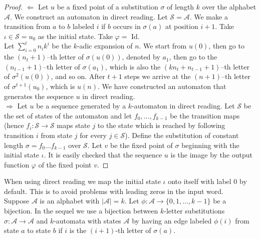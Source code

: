 \documentclass{article}
\begin{document}
\begin{proof}
$\Leftarrow$ Let $u$ be a fixed point of a substitution $\sigma$ of length
$k$ over the alphabet $\mathcal{A}$. We construct an automaton in direct 
reading. Let $\mathcal{S = A}$. We make a transition from $a$ to $b$ labeled 
$i$ if $b$ occurs in $\sigma(a)$ at position $i + 1$. Take 
$\iota \in \mathcal{S} = u_0$ as the initial state. Take $\varphi =$ Id.\\
Let $\sum_{i = 0}^t n_i k^i$ be the $k$-adic expansion of $n$. We start from 
$u(0)$, then go to the $(n_t + 1)$--th letter of $\sigma(u(0))$, denoted by 
$a_1$, then go to the $(n_{t - 1} + 1)$--th letter of $\sigma(a_1)$, which is 
also the $(kn_t + n_{t - 1} + 1)$--th letter of $\sigma^2(u(0))$, and so on.
After $t + 1$ steps we arrive at the $(n + 1)$--th letter of 
$\sigma^{t + 1}(u_0)$, which is $u(n)$. We have constructed an automaton that 
generates the sequence $u$ in direct reading.\\
$\Rightarrow$ Let $u$ be a sequence generated by a $k$-automaton in direct
reading. Let $\mathcal{S}$ be the set of states of the automaton and let
$f_0, \ldots, f_{k - 1}$ be the transition maps (hence 
$f_i: \mathcal{S \to S}$ maps state $j$ to the state which is reached by 
following transition $i$ from state $j$ for every $j \in \mathcal{S}$). Define 
the substitution of constant length $\sigma = f_0 \dots f_{k - 1}$ over 
$\mathcal{S}$. Let $v$ be the fixed point of $\sigma$ beginning with the 
initial state $\iota$. It is easily checked that the sequence $u$ is the image 
by the output function $\varphi$ of the fixed point $v$. 
\end{proof}

When using direct reading we map the initial state $\iota$ onto itself with 
label 0 by default. This is to avoid problems with leading zeros in the input 
word.\\
Suppose $\mathcal{A}$ is an alphabet with $|\mathcal{A}| = k$. Let 
$\phi: \mathcal{A} \to \{0, 1, \ldots, k - 1\}$ be a bijection. In the
sequel we use a bijection between $k$-letter substitutions 
$\sigma: \mathcal{A} \to \mathcal{A}$ and $k$-automata with states 
$\mathcal{A}$ by having an edge labeled $\phi(i)$ from state $a$ to state $b$ 
if $i$ is the $(i + 1)$-th letter of $\sigma(a)$. 
\end{document}
